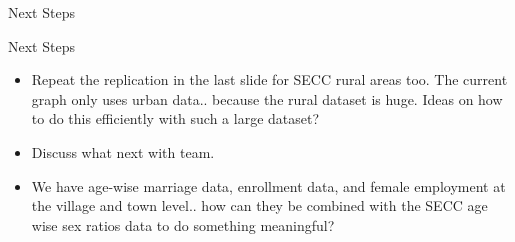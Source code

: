 \documentclass[aspectratio=169]{beamer}
\begin{document}
\begin{section}{Next Steps}
\begin{frame}{Next Steps}
  \begin{itemize}
    \item Repeat the replication in the last slide for SECC rural
      areas too. The current graph only uses urban data.. because the
      rural dataset is huge. Ideas on how to do this efficiently with
      such a large dataset?
    \item Discuss what next with team.
    \item We have age-wise marriage data, enrollment data, and female
      employment at the village and town level.. how can they be
      combined with the SECC age wise sex ratios data to do something
      meaningful?
  \end{itemize}
\end{frame}
\end{section}
\end{document}
